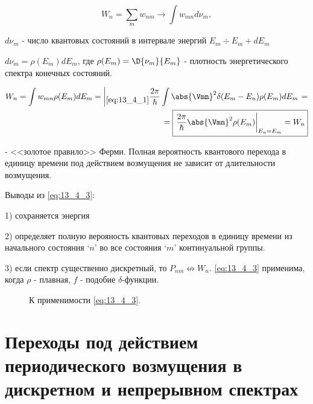 $$
W_n = \sum_m w_{nm} \to \int w_{mn} d \nu_m,
$$

$d \nu_m$ - число квантовых состояний в интервале энергий $E_m \div E_m + dE_m$

$\boxed{d \nu_m = \rho(E_m) dE_m}$, где $\rho(E_m) = \D{\nu_m}{E_m}$ - плотность энергетического спектра конечных состояний.

\begin{eqnarray}
W_n = \int w_{mn} \rho(E_m)dE_m = \left |_{\eqref{eq:13_4_1}} \dfrac{2\pi}{\hbar} \int \abs{\Vmn}^2 \delta(E_m - E_n) \rho(E_m)dE_m \right .= \nonumber \\
\label{eq:13_4_3} = \boxed{ \left. \frac{2\pi}{\hbar} \abs{\Vmn}^2 \rho(E_m) \right|_{E_n = E_m} = W_n}
\end{eqnarray}

- <<золотое правило>> Ферми. Полная вероятность квантового перехода в единицу времени под действием возмущения не зависит от длительности возмущения.

Выводы из \eqref{eq:13_4_3}:

1) сохраняется энергия

2) определяет полную верояность квантовых переходов в единицу времени из начального состояния `$n$' во все состояния `$m$' континуальной группы. 

3) если спектр существенно дискретный, то $P_{nm} \not \leftrightarrow W_n$. \eqref{eq:13_4_3} применима, когда $\rho$ - плавная, $f$ - подобие $\delta$-функции.

\begin{figure}[h!]
\centering
{}
\caption{К применимости \eqref{eq:13_4_3}.} \label{fig:13_4}
\end{figure}

\section{Переходы под действием периодического возмущения в дискретном и непрерывном спектрах}

